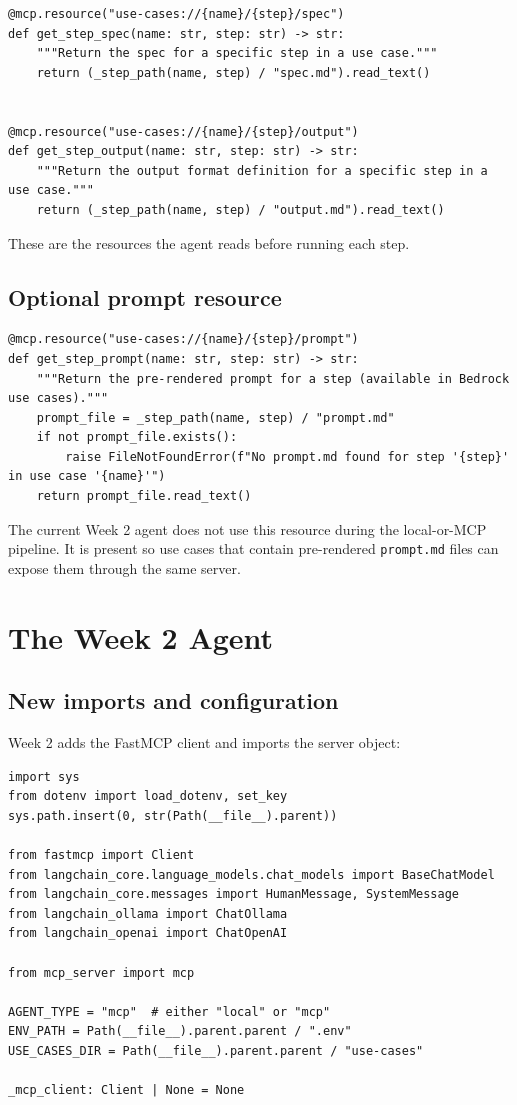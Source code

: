 \documentclass[12pt, a4paper]{article}
\begin{document}
\begin{lstlisting}[style=pythonstyle]
@mcp.resource("use-cases://{name}/{step}/spec")
def get_step_spec(name: str, step: str) -> str:
    """Return the spec for a specific step in a use case."""
    return (_step_path(name, step) / "spec.md").read_text()


@mcp.resource("use-cases://{name}/{step}/output")
def get_step_output(name: str, step: str) -> str:
    """Return the output format definition for a specific step in a use case."""
    return (_step_path(name, step) / "output.md").read_text()
\end{lstlisting}

These are the resources the agent reads before running each step.

\subsection{Optional prompt resource}

\begin{lstlisting}[style=pythonstyle]
@mcp.resource("use-cases://{name}/{step}/prompt")
def get_step_prompt(name: str, step: str) -> str:
    """Return the pre-rendered prompt for a step (available in Bedrock use cases)."""
    prompt_file = _step_path(name, step) / "prompt.md"
    if not prompt_file.exists():
        raise FileNotFoundError(f"No prompt.md found for step '{step}' in use case '{name}'")
    return prompt_file.read_text()
\end{lstlisting}

The current Week 2 agent does not use this resource during the local-or-MCP pipeline. It is present so use cases that contain pre-rendered \texttt{prompt.md} files can expose them through the same server.

\section{The Week 2 Agent}

\subsection{New imports and configuration}

Week 2 adds the FastMCP client and imports the server object:

\begin{lstlisting}[style=pythonstyle]
import sys
from dotenv import load_dotenv, set_key
sys.path.insert(0, str(Path(__file__).parent))

from fastmcp import Client
from langchain_core.language_models.chat_models import BaseChatModel
from langchain_core.messages import HumanMessage, SystemMessage
from langchain_ollama import ChatOllama
from langchain_openai import ChatOpenAI

from mcp_server import mcp

AGENT_TYPE = "mcp"  # either "local" or "mcp"
ENV_PATH = Path(__file__).parent.parent / ".env"
USE_CASES_DIR = Path(__file__).parent.parent / "use-cases"

_mcp_client: Client | None = None
\end{lstlisting}
\end{document}
